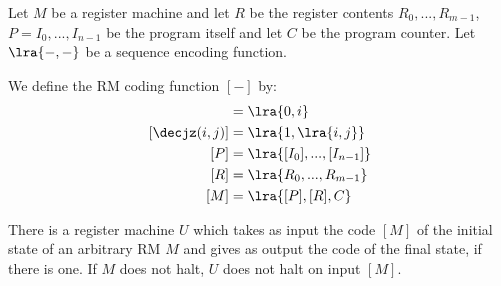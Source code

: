 \documentclass{article}
\begin{document}
\begin{definition}
    Let $M$ be a register machine and let $R$ be the register contents $R_0,...,R_{m-1}$,
    $P=I_0,...,I_{n-1}$ be the program itself and let $C$ be the program counter.
    Let $\lra{-,-}$ be a sequence encoding function.

    We define the RM coding function $[-]$ by:
    \begin{align*}
        [\inc(i)]     & = \lra{0,i}                   \\
        [\decjz(i,j)] & = \lra{1,\lra{i,j}}           \\
        [P]           & = \lra{[I_0], ..., [I_{n-1}]} \\
        [R]           & = \lra{R_0, ..., R_{m-1}}     \\
        [M]           & = \lra{[P], [R], C}
    \end{align*}
\end{definition}

\begin{theorem}[Notes I.7]
    There is a register machine $U$ which takes as input the code $\left[M\right]$ of the
    initial state of an arbitrary RM $M$ and gives as output the code of the final
    state, if there is one. If $M$ does not halt, $U$ does not halt on input
    $\left[M\right]$.
\end{theorem}
\end{document}
